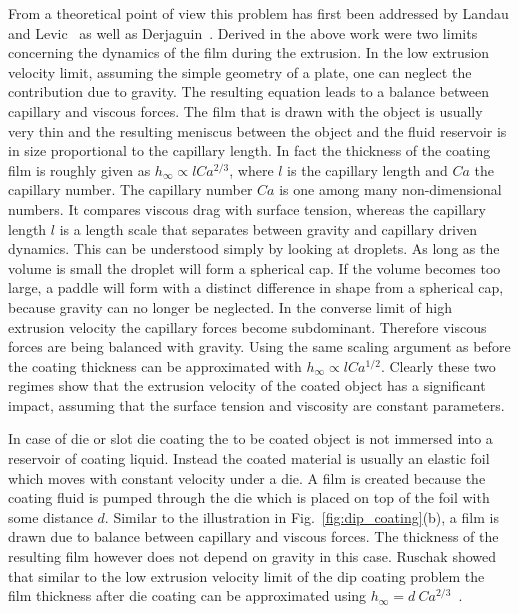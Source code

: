 From a theoretical point of view this problem has first been addressed by Landau and Levic~\cite{landau1988dragging} as well as Derjaguin~\cite{derjaguin1993thickness}.
Derived in the above work were two limits concerning the dynamics of the film during the extrusion.
In the low extrusion velocity limit, assuming the simple geometry of a plate, one can neglect the contribution due to gravity.
The resulting equation leads to a balance between capillary and viscous forces. 
The film that is drawn with the object is usually very thin and the resulting meniscus between the object and the fluid reservoir is in size proportional to the capillary length.
In fact the thickness of the coating film is roughly given as $h_{\infty} \propto l Ca^{2/3}$, where $l$ is the capillary length and $Ca$ the capillary number.
The capillary number $Ca$ is one among many non-dimensional numbers.
It compares viscous drag with surface tension, whereas the capillary length $l$ is a length scale that separates between gravity and capillary driven dynamics.
This can be understood simply by looking at droplets. 
As long as the volume is small the droplet will form a spherical cap.
If the volume becomes too large, a paddle will form with a distinct difference in shape from a spherical cap, because gravity can no longer be neglected.
In the converse limit of high extrusion velocity the capillary forces become subdominant.
Therefore viscous forces are being balanced with gravity. 
Using the same scaling argument as before the coating thickness can be approximated with $h_{\infty} \propto l Ca^{1/2}$.
Clearly these two regimes show that the extrusion velocity of the coated object has a significant impact, assuming that the surface tension and viscosity are constant parameters.

In case of die or slot die coating the to be coated object is not immersed into a reservoir of coating liquid.
Instead the coated material is usually an elastic foil which moves with constant velocity under a die.
A film is created because the coating fluid is pumped through the die which is placed on top of the foil with some distance $d$.
Similar to the illustration in Fig.~\ref{fig:dip_coating}(b), a film is drawn due to balance between capillary and viscous forces.
The thickness of the resulting film however does not depend on gravity in this case.
Ruschak showed that similar to the low extrusion velocity limit of the dip coating problem the film thickness after die coating can be approximated using $h_{\infty} = d~Ca^{2/3}$~\cite{RUSCHAK19761057}.

